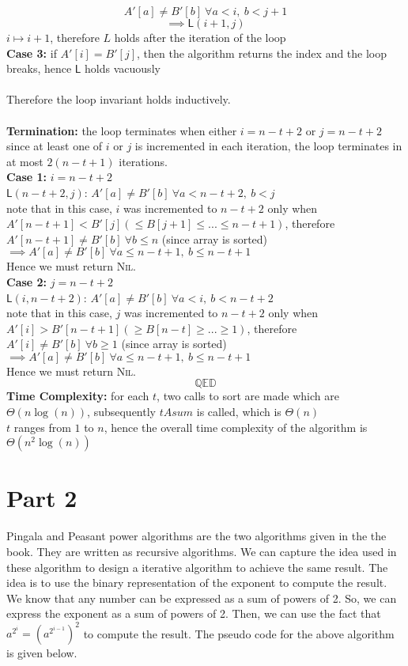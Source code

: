 \documentclass[12pt]{article}
\begin{document}
    $$A'[a] \neq B'[b] ~ \forall a < i, ~ b < j+1$$
    $$\implies \mathsf{L}(i+1, j)$$
    $i \mapsto i+1$, therefore $L$ holds after the iteration of the loop\\
\textbf{Case 3:} if $A'[i] = B'[j]$, then the algorithm returns the index and the loop breaks, hence $\mathsf{L}$ holds vacuously\\
\\
Therefore the loop invariant holds inductively.\\
\\
\textbf{Termination:} the loop terminates when either $i = n-t+2$ or $j = n-t+2$\\
since at least one of $i$ or $j$ is incremented in each iteration, the loop terminates in at most $2(n-t+1)$ iterations.\\
\textbf{Case 1:} $i = n-t+2$\\
$\mathsf{L}(n-t+2, j)$: $A'[a] \neq B'[b] ~ \forall a < n-t+2, ~ b < j$\\
note that in this case, $i$ was incremented to $n-t+2$ only when $A'[n-t+1] < B'[j] (\leq B[j+1] \leq...\leq n-t+1)$, therefore $A'[n-t+1] \neq B'[b] ~ \forall b \leq n$ (since array is sorted)\\
$\implies A'[a] \neq B'[b] ~ \forall a \leq n-t+1, ~ b \leq n-t+1$\\
Hence we must return \textsc{Nil}.\\
\textbf{Case 2:} $j = n-t+2$\\
$\mathsf{L}(i, n-t+2)$: $A'[a] \neq B'[b] ~ \forall a < i, ~ b < n-t+2$\\
note that in this case, $j$ was incremented to $n-t+2$ only when $A'[i] > B'[n-t+1] (\geq B[n-t] \geq...\geq 1)$, therefore $A'[i] \neq B'[b] ~ \forall b \geq 1$ (since array is sorted)\\
$\implies A'[a] \neq B'[b] ~ \forall a \leq n-t+1, ~ b \leq n-t+1$\\
Hence we must return \textsc{Nil}.\\
$$\mathbb{Q} \mathbb{E} \mathbb{D}$$
\textbf{Time Complexity:} for each $t$, two calls to sort are made which are $\varTheta(n \log(n))$, subsequently $tAsum$ is called, which is $\varTheta(n)$\\
$t$ ranges from $1$ to $n$, hence the overall time complexity of the algorithm is $\varTheta(n^2 \log(n))$\\  
\section{Part 2} \label{sec:part_2}
\begin{problem}
    
\end{problem}
Pingala and Peasant power algorithms are the two algorithms given in the the book. They are written as recursive algorithms. We can capture the idea used in these algorithm to design a iterative algorithm to achieve the same result. The idea is to use the binary representation of the exponent to compute the result. We know that any number can be expressed as a sum of powers of 2. So, we can express the exponent as a sum of powers of 2. Then, we can use the fact that $a^{2^i} = (a^{2^{i-1}})^2$ to compute the result. The pseudo code for the above algorithm is given below.
\end{document}
